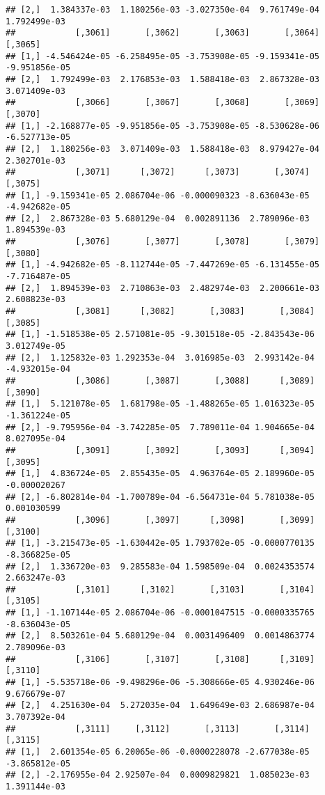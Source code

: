 \documentclass[
]{article}
\begin{document}
\begin{verbatim}
## [2,]  1.384337e-03  1.180256e-03 -3.027350e-04  9.761749e-04  1.792499e-03
##            [,3061]       [,3062]       [,3063]       [,3064]       [,3065]
## [1,] -4.546424e-05 -6.258495e-05 -3.753908e-05 -9.159341e-05 -9.951856e-05
## [2,]  1.792499e-03  2.176853e-03  1.588418e-03  2.867328e-03  3.071409e-03
##            [,3066]       [,3067]       [,3068]       [,3069]       [,3070]
## [1,] -2.168877e-05 -9.951856e-05 -3.753908e-05 -8.530628e-06 -6.527713e-05
## [2,]  1.180256e-03  3.071409e-03  1.588418e-03  8.979427e-04  2.302701e-03
##            [,3071]      [,3072]      [,3073]       [,3074]       [,3075]
## [1,] -9.159341e-05 2.086704e-06 -0.000090323 -8.636043e-05 -4.942682e-05
## [2,]  2.867328e-03 5.680129e-04  0.002891136  2.789096e-03  1.894539e-03
##            [,3076]       [,3077]       [,3078]       [,3079]       [,3080]
## [1,] -4.942682e-05 -8.112744e-05 -7.447269e-05 -6.131455e-05 -7.716487e-05
## [2,]  1.894539e-03  2.710863e-03  2.482974e-03  2.200661e-03  2.608823e-03
##            [,3081]      [,3082]       [,3083]       [,3084]       [,3085]
## [1,] -1.518538e-05 2.571081e-05 -9.301518e-05 -2.843543e-06  3.012749e-05
## [2,]  1.125832e-03 1.292353e-04  3.016985e-03  2.993142e-04 -4.932015e-04
##            [,3086]       [,3087]       [,3088]      [,3089]       [,3090]
## [1,]  5.121078e-05  1.681798e-05 -1.488265e-05 1.016323e-05 -1.361224e-05
## [2,] -9.795956e-04 -3.742285e-05  7.789011e-04 1.904665e-04  8.027095e-04
##            [,3091]       [,3092]       [,3093]      [,3094]      [,3095]
## [1,]  4.836724e-05  2.855435e-05  4.963764e-05 2.189960e-05 -0.000020267
## [2,] -6.802814e-04 -1.700789e-04 -6.564731e-04 5.781038e-05  0.001030599
##            [,3096]       [,3097]      [,3098]       [,3099]       [,3100]
## [1,] -3.215473e-05 -1.630442e-05 1.793702e-05 -0.0000770135 -8.366825e-05
## [2,]  1.336720e-03  9.285583e-04 1.598509e-04  0.0024353574  2.663247e-03
##            [,3101]      [,3102]       [,3103]       [,3104]       [,3105]
## [1,] -1.107144e-05 2.086704e-06 -0.0001047515 -0.0000335765 -8.636043e-05
## [2,]  8.503261e-04 5.680129e-04  0.0031496409  0.0014863774  2.789096e-03
##            [,3106]       [,3107]       [,3108]      [,3109]      [,3110]
## [1,] -5.535718e-06 -9.498296e-06 -5.308666e-05 4.930246e-06 9.676679e-07
## [2,]  4.251630e-04  5.272035e-04  1.649649e-03 2.686987e-04 3.707392e-04
##            [,3111]     [,3112]       [,3113]       [,3114]       [,3115]
## [1,]  2.601354e-05 6.20065e-06 -0.0000228078 -2.677038e-05 -3.865812e-05
## [2,] -2.176955e-04 2.92507e-04  0.0009829821  1.085023e-03  1.391144e-03

\end{verbatim}
\end{document}
